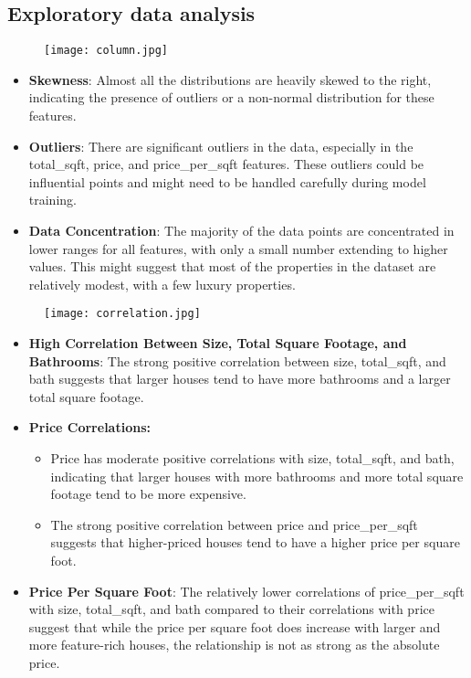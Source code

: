 \documentclass[a4paper, 12pt]{article}
\begin{document}
\subsection{Exploratory data analysis}  
\begin{figure}[tbh]
    \centering
    \texttt{[image: column.jpg]}
\end{figure}
\begin{itemize}
    \item \textbf{Skewness}: Almost all the distributions are heavily skewed to the right, indicating the presence of outliers or a non-normal distribution for these features.
    \item \textbf{Outliers}: There are significant outliers in the data, especially in the total\_sqft, price, and price\_per\_sqft features. These outliers could be influential points and might need to be handled carefully during model training.
    \item \textbf{Data Concentration}: The majority of the data points are concentrated in lower ranges for all features, with only a small number extending to higher values. This might suggest that most of the properties in the dataset are relatively modest, with a few luxury properties.
\end{itemize}
\newpage
\begin{figure}[tbh]
    \centering
    \texttt{[image: correlation.jpg]}
\end{figure}
\begin{itemize}
    \item \textbf{High Correlation Between Size, Total Square Footage, and Bathrooms}: The strong positive correlation between size, total\_sqft, and bath suggests that larger houses tend to have more bathrooms and a larger total square footage.
    \item \textbf{Price Correlations:}
    \begin{itemize}
        \item Price has moderate positive correlations with size, total\_sqft, and bath, indicating that larger houses with more bathrooms and more total square footage tend to be more expensive.
        \item The strong positive correlation between price and price\_per\_sqft suggests that higher-priced houses tend to have a higher price per square foot.
    \end{itemize}
    \item \textbf{Price Per Square Foot}: The relatively lower correlations of price\_per\_sqft with size, total\_sqft, and bath compared to their correlations with price suggest that while the price per square foot does increase with larger and more feature-rich houses, the relationship is not as strong as the absolute price.
\end{itemize}
\end{document}
